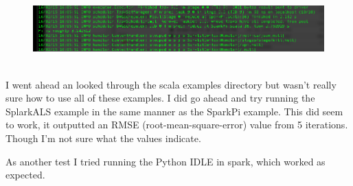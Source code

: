 \documentclass[10pt]{article}
\begin{document}
\begin{figure}[!h]
\includegraphics[scale=0.37]{sparkpi.png}
\centering
\end{figure}\\
\indent I went ahead an looked through the scala examples directory but wasn't really sure how to use all of these examples. I did go ahead and try running the SplarkALS example in the same manner as the SparkPi example. This did seem to work, it outputted an RMSE (root-mean-square-error) value from 5 iterations. Though I'm not sure what the values indicate.
\par
{}%
\hfill
{}%
\par
\indent As another test I tried running the Python IDLE in spark, which worked as expected.
\end{document}
